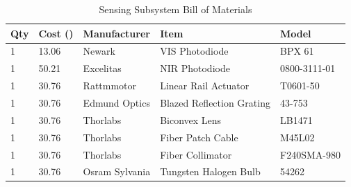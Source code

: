 \begin{table}[H]
	\centering
	\label{table:SensingBOM}
	\caption{Sensing Subsystem Bill of Materials}
	\bigskip
	\begin{tabular}{|p{2cm}|p{2.5cm}|p{2cm}|p{2.75cm}|p{1.75cm}|}
	\hline
	Qty & Cost (\textdollar) & Manufacturer & Item & Model\\
	\hline
	1 & 13.06 & Newark & VIS Photodiode & BPX 61\\
	\hline
	1 & 50.21 & Excelitas & NIR Photodiode & 0800-3111-01\\
	\hline
	1 & 30.76 & Rattmmotor & Linear Rail Actuator & T0601-50\\
	\hline
	1 & 30.76 & Edmund Optics & Blazed Reflection Grating & 43-753\\
	\hline
	1 & 30.76 & Thorlabs & Biconvex Lens & LB1471\\
	\hline
	1 & 30.76 & Thorlabs & Fiber Patch Cable & M45L02\\
	\hline
	1 & 30.76 & Thorlabs & Fiber Collimator & F240SMA-980\\
	\hline
	1 & 30.76 & Osram Sylvania & Tungsten Halogen Bulb & 54262\\
	\hline
	\end{tabular}
\end{table}